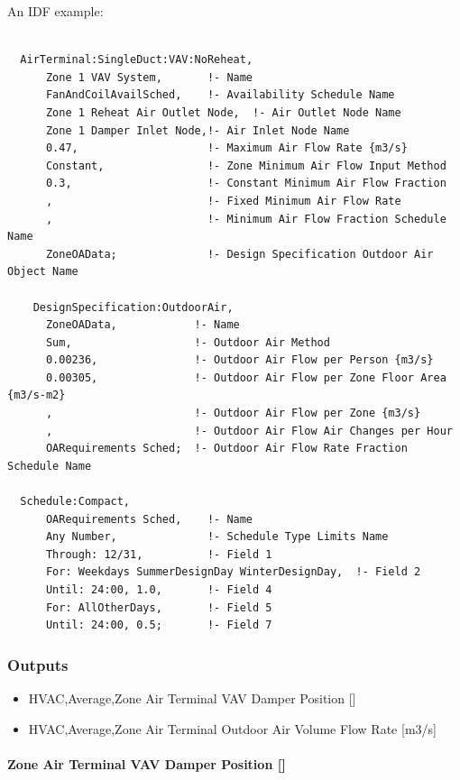 An IDF example:

\begin{lstlisting}

  AirTerminal:SingleDuct:VAV:NoReheat,
      Zone 1 VAV System,       !- Name
      FanAndCoilAvailSched,    !- Availability Schedule Name
      Zone 1 Reheat Air Outlet Node,  !- Air Outlet Node Name
      Zone 1 Damper Inlet Node,!- Air Inlet Node Name
      0.47,                    !- Maximum Air Flow Rate {m3/s}
      Constant,                !- Zone Minimum Air Flow Input Method
      0.3,                     !- Constant Minimum Air Flow Fraction
      ,                        !- Fixed Minimum Air Flow Rate
      ,                        !- Minimum Air Flow Fraction Schedule Name
      ZoneOAData;              !- Design Specification Outdoor Air Object Name

    DesignSpecification:OutdoorAir,
      ZoneOAData,            !- Name
      Sum,                   !- Outdoor Air Method
      0.00236,               !- Outdoor Air Flow per Person {m3/s}
      0.00305,               !- Outdoor Air Flow per Zone Floor Area {m3/s-m2}
      ,                      !- Outdoor Air Flow per Zone {m3/s}
      ,                      !- Outdoor Air Flow Air Changes per Hour
      OARequirements Sched;  !- Outdoor Air Flow Rate Fraction Schedule Name

  Schedule:Compact,
      OARequirements Sched,    !- Name
      Any Number,              !- Schedule Type Limits Name
      Through: 12/31,          !- Field 1
      For: Weekdays SummerDesignDay WinterDesignDay,  !- Field 2
      Until: 24:00, 1.0,       !- Field 4
      For: AllOtherDays,       !- Field 5
      Until: 24:00, 0.5;       !- Field 7
\end{lstlisting}

\subsubsection{Outputs}\label{outputs-5}

\begin{itemize}
\item
  HVAC,Average,Zone Air Terminal VAV Damper Position {[]}
\item
  HVAC,Average,Zone Air Terminal Outdoor Air Volume Flow Rate {[}m3/s{]}
\end{itemize}

\paragraph{Zone Air Terminal VAV Damper Position {[]}}\label{zone-air-terminal-vav-damper-position-3}

